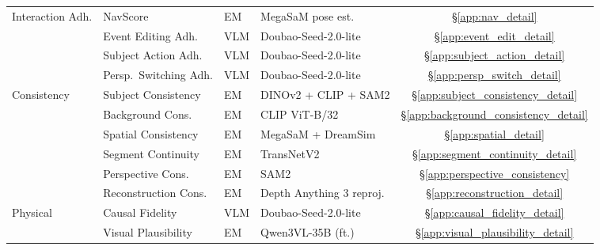 \documentclass{llmxive}
\begin{document}
\begin{table}[!htbp]
\begin{tabular}{@{}l l l l c@{}}
\midrule
\multirow{4}{*}{Interaction Adh.}
  & NavScore             & EM  & MegaSaM pose est.     & \hyperref[app:nav_detail]{\S\ref*{app:nav_detail}} \\
  & Event Editing Adh.   & VLM & Doubao-Seed-2.0-lite  & \hyperref[app:event_edit_detail]{\S\ref*{app:event_edit_detail}} \\
  & Subject Action Adh.  & VLM & Doubao-Seed-2.0-lite  & \hyperref[app:subject_action_detail]{\S\ref*{app:subject_action_detail}} \\
  & Persp.\ Switching Adh.  & VLM & Doubao-Seed-2.0-lite  & \hyperref[app:persp_switch_detail]{\S\ref*{app:persp_switch_detail}} \\
\midrule
\multirow{6}{*}{Consistency}
  & Subject Consistency  & EM  & DINOv2 + CLIP + SAM2  & \hyperref[app:subject_consistency_detail]{\S\ref*{app:subject_consistency_detail}} \\
  & Background Cons.     & EM  & CLIP ViT-B/32         & \hyperref[app:background_consistency_detail]{\S\ref*{app:background_consistency_detail}} \\
  & Spatial Consistency  & EM  & MegaSaM + DreamSim    & \hyperref[app:spatial_detail]{\S\ref*{app:spatial_detail}} \\
  & Segment Continuity   & EM  & TransNetV2            & \hyperref[app:segment_continuity_detail]{\S\ref*{app:segment_continuity_detail}} \\
  & Perspective Cons.    & EM  & SAM2   & \hyperref[app:perspective_consistency]{\S\ref*{app:perspective_consistency}} \\
  & Reconstruction Cons. & EM  & Depth Anything 3 reproj. & \hyperref[app:reconstruction_detail]{\S\ref*{app:reconstruction_detail}} \\
\midrule
\multirow{2}{*}{Physical}
  & Causal Fidelity     & VLM & Doubao-Seed-2.0-lite  & \hyperref[app:causal_fidelity_detail]{\S\ref*{app:causal_fidelity_detail}} \\
  & Visual Plausibility & EM & Qwen3VL-35B (ft.)     & \hyperref[app:visual_plausibility_detail]{\S\ref*{app:visual_plausibility_detail}} \\
\bottomrule
\end{tabular}
\end{table}
\end{document}
